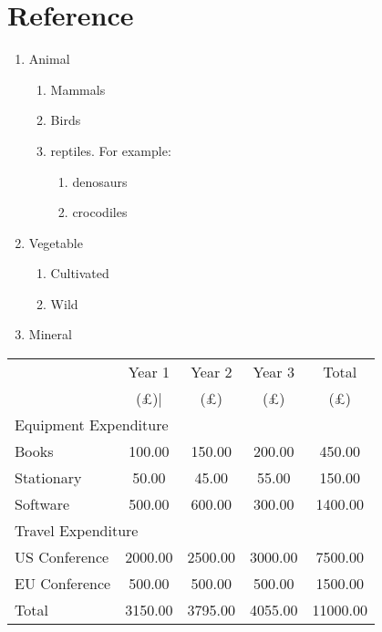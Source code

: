 \documentclass{article}
\begin{document}
\section{Reference}
\begin{enumerate}
    \item Animal
    \begin{enumerate}
        \item Mammals
        \item Birds
        \item reptiles. For example:
        \begin{enumerate}
            \item denosaurs
            \item crocodiles
        \end{enumerate}
    \end{enumerate}
    \item Vegetable
    \begin{enumerate}
        \item Cultivated
        \item Wild
    \end{enumerate}
    \item Mineral
\end{enumerate}
\begin{tabular}{|l|cccc|}\cline{2-5}
\multicolumn{1}{c|}{}&Year 1 &Year 2 &Year 3 &Total\\
\multicolumn{1}{c|}{}&(\pounds){|}& (\pounds) &(\pounds) &(\pounds)\\\cline{2-5}
\multicolumn{5}{l}{Equipment Expenditure} \\ \hline
Books &100.00& 150.00& 200.00 &450.00\\\hline
Stationary& 50.00 &45.00& 55.00& 150.00\\\hline
Software &500.00& 600.00& 300.00& 1400.00\\\hline
\multicolumn{5}{l}{Travel Expenditure} \\ \hline
US Conference& 2000.00& 2500.00& 3000.00& 7500.00\\\hline
EU Conference& 500.00& 500.00& 500.00& 1500.00\\ \hline\hline
Total& 3150.00& 3795.00& 4055.00& 11000.00\\\hline
\end{tabular}
\end{document}
